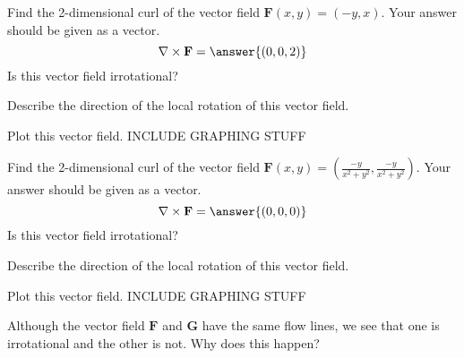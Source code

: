 \documentclass{ximera}
\begin{document}

\begin{problem}
Find the 2-dimensional curl of the vector field $\mathbf{F}(x,y) = (-y,x)$. Your answer should be given as a vector.
\[
\nabla\times\mathbf{F} = \answer{(0,0,2)}
\]
Is this vector field irrotational?
\begin{multipleChoice}
\end{multipleChoice}
Describe the direction of the local rotation of this vector field.
\begin{multipleChoice}
\end{multipleChoice}
Plot this vector field.
INCLUDE GRAPHING STUFF

Find the 2-dimensional curl of the vector field $\mathbf{F}(x,y) = \left(\frac{-y}{x^2+y^2}, \frac{-y}{x^2+y^2}\right)$. Your answer should be given as a vector.
\[
\nabla\times\mathbf{F} = \answer{(0,0,0)}
\]
Is this vector field irrotational?
\begin{multipleChoice}
\end{multipleChoice}
Describe the direction of the local rotation of this vector field.
\begin{multipleChoice}
\end{multipleChoice}
Plot this vector field.
INCLUDE GRAPHING STUFF

Although the vector field $\mathbf{F}$ and $\mathbf{G}$ have the same flow lines, we see that one is irrotational and the other is not. Why does this happen?
\begin{multipleChoice}
\end{multipleChoice}

\end{problem}
\end{document}
